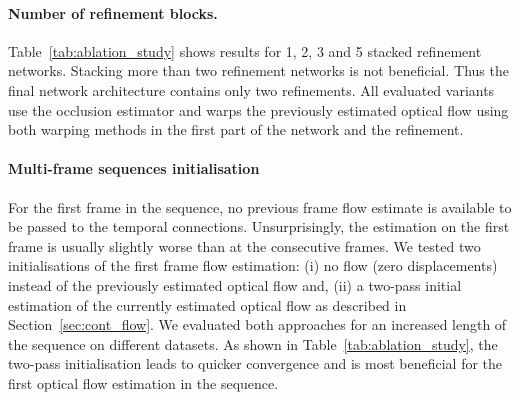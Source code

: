 \documentclass[runningheads]{llncs}
\begin{document}
\paragraph{\bf\textbf{Number of refinement blocks.}}
Table~\ref{tab:ablation_study} shows results for 1, 2, 3 and 5 stacked refinement networks.
Stacking more than two refinement networks is not beneficial.
Thus the final network architecture contains only two refinements.
All evaluated variants use the occlusion estimator and warps the previously estimated optical flow using both warping methods in the first part of the network and the refinement.


\paragraph{\bf\textbf{Multi-frame sequences initialisation}}
For the first frame in the sequence, no previous frame flow estimate is available to be passed to the temporal connections.
Unsurprisingly, the estimation on the first frame is usually slightly worse than at the consecutive frames.
We tested two initialisations of the first frame flow estimation: (i) no flow (zero displacements) instead of the previously estimated optical flow and, (ii) a two-pass initial estimation of the currently estimated optical flow as described in Section~\ref{sec:cont_flow}.
We evaluated both approaches for an increased length of the sequence on different datasets.
As shown in Table~\ref{tab:ablation_study}, the two-pass initialisation leads to quicker convergence and is most beneficial for the first optical flow estimation in the sequence.
\end{document}
